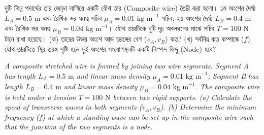 \documentclass[12pt, a4paper]{article}
\begin{document}
\vspace{1.5em}

\begin{tcolorbox}[questionbox={প্রশ্ন (Question) 10}]
    \noindent
    দুটি ভিন্ন পদার্থের তার জোড়া লাগিয়ে একটি যৌথ তার (Composite wire) তৈরি করা হলো। ১ম অংশের দৈর্ঘ্য $L_A = 0.5\text{ m}$ এবং রৈখিক ভর ঘনত্ব সচিব $\mu_A = 0.01\text{ kg m}^{-1}$ সচিব; ২য় অংশের দৈর্ঘ্য $L_B = 0.4\text{ m}$ এবং রৈখিক ভর ঘনত্ব $\mu_B = 0.04\text{ kg m}^{-1}$। যৌথ তারটিকে দুটি দৃঢ় অবলম্বনের মাঝে সচিব $T = 100\text{ N}$ টানে রাখা হয়েছে। (ক) তারের উভয় অংশে আড় তরঙ্গের বেগ ($v_A, v_B$) কত? (খ) সর্বনিম্ন কত কম্পাঙ্কে ($f$) যৌথ তারটিতে স্থির তরঙ্গ সৃষ্টি হলে দুই অংশের সংযোগস্থলটি একটি নিস্পন্দ বিন্দু (Node) হবে?
    
    \vspace{0.8em}
    \begin{english}
    \noindent\textit{\color{darkgray}
    A composite stretched wire is formed by joining two wire segments. Segment A has length $L_A = 0.5\text{ m}$ and linear mass density $\mu_A = 0.01\text{ kg m}^{-1}$; Segment B has length $L_B = 0.4\text{ m}$ and linear mass density $\mu_B = 0.04\text{ kg m}^{-1}$. The composite wire is held under a tension $T = 100\text{ N}$ between two rigid supports. (a) Calculate the speed of transverse waves in both segments ($v_A, v_B$). (b) Determine the minimum frequency ($f$) at which a standing wave can be set up in the composite wire such that the junction of the two segments is a node.
    }
    \end{english}
\end{tcolorbox}
\end{document}
